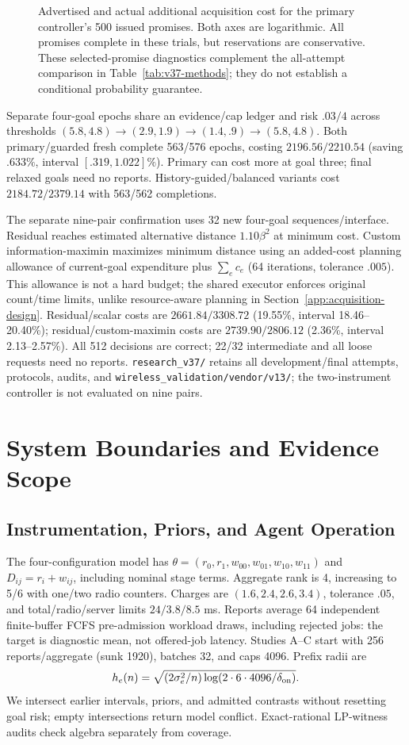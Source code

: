 \begin{figure}[t]
\centering
\resizebox{\columnwidth}{!}{}
\caption{Advertised and actual additional acquisition cost for the primary controller's 500 issued promises. Both axes are logarithmic. All promises complete in these trials, but reservations are conservative. These selected-promise diagnostics complement the all-attempt comparison in Table~\ref{tab:v37-methods}; they do not establish a conditional probability guarantee.}
\label{fig:v37-promises}
\end{figure}
Separate four-goal epochs share an evidence/cap ledger and risk $.03/4$ across thresholds $(5.8,4.8)\to(2.9,1.9)\to(1.4,.9)\to(5.8,4.8)$. Both primary/guarded fresh complete 563/576 epochs, costing $2196.56/2210.54$ (saving $.633\%$, interval $[.319,1.022]\%$). Primary can cost more at goal three; final relaxed goals need no reports. History-guided/balanced variants cost $2184.72/2379.14$ with 563/562 completions.

The separate nine-pair confirmation uses 32 new four-goal sequences/interface. Residual reaches estimated alternative distance $1.10\beta^2$ at minimum cost. Custom information-maximin maximizes minimum distance using an added-cost planning allowance of current-goal expenditure plus $\sum_ec_e$ (64 iterations, tolerance $.005$). This allowance is not a hard budget; the shared executor enforces original count/time limits, unlike resource-aware planning in Section~\ref{app:acquisition-design}. Residual/scalar costs are $2661.84/3308.72$ (19.55\%, interval 18.46--20.40\%); residual/custom-maximin costs are $2739.90/2806.12$ (2.36\%, interval 2.13--2.57\%). All 512 decisions are correct; 22/32 intermediate and all loose requests need no reports. \texttt{research\_v37/} retains all development/final attempts, protocols, audits, and \texttt{wireless\_validation/vendor/v13/}; the two-instrument controller is not evaluated on nine pairs.

\section{System Boundaries and Evidence Scope}
\subsection{Instrumentation, Priors, and Agent Operation}
\label{app:operating-study}
The four-configuration model has $\theta=(r_0,r_1,w_{00},w_{01},w_{10},w_{11})$ and $D_{ij}=r_i+w_{ij}$, including nominal stage terms. Aggregate rank is 4, increasing to 5/6 with one/two radio counters. Charges are $(1.6,2.4,2.6,3.4)$, tolerance $.05$, and total/radio/server limits $24/3.8/8.5$ ms. Reports average 64 independent finite-buffer FCFS pre-admission workload draws, including rejected jobs: the target is diagnostic mean, not offered-job latency. Studies A--C start with 256 reports/aggregate (sunk 1920), batches 32, and caps 4096. Prefix radii are
$$h_e(n)=\sqrt{(2\sigma_e^2/n)\log(2\cdot6\cdot4096/\delta_{\rm on})}.$$
We intersect earlier intervals, priors, and admitted contrasts without resetting goal risk; empty intersections return model conflict. Exact-rational LP-witness audits check algebra separately from coverage.

